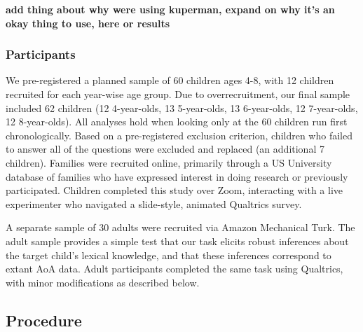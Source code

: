 \documentclass[10pt, letterpaper]{article}
\begin{document}
\textbf{add thing about why were using kuperman, expand on why it's an
okay thing to use, here or results}

\hypertarget{participants}{%
\subsubsection{Participants}\label{participants}}

We pre-registered a planned sample of 60 children ages 4-8, with 12
children recruited for each year-wise age group. Due to overrecruitment,
our final sample included 62 children (12 4-year-olds, 13 5-year-olds,
13 6-year-olds, 12 7-year-olds, 12 8-year-olds). All analyses hold when
looking only at the 60 children run first chronologically. Based on a
pre-registered exclusion criterion, children who failed to answer all of
the questions were excluded and replaced (an additional 7 children).
Families were recruited online, primarily through a US University
database of families who have expressed interest in doing research or
previously participated. Children completed this study over Zoom,
interacting with a live experimenter who navigated a slide-style,
animated Qualtrics survey.

A separate sample of 30 adults were recruited via Amazon Mechanical
Turk. The adult sample provides a simple test that our task elicits
robust inferences about the target child's lexical knowledge, and that
these inferences correspond to extant AoA data. Adult participants
completed the same task using Qualtrics, with minor modifications as
described below.

\hypertarget{procedure}{%
\subsection{Procedure}\label{procedure}}
\end{document}
